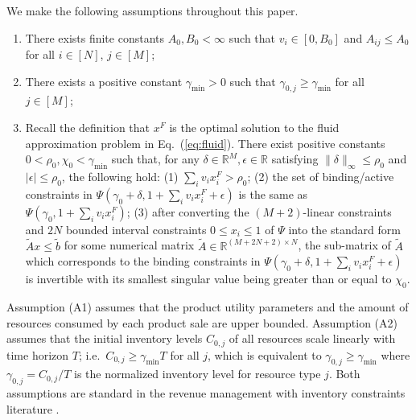 \documentclass[opre]{informs3aa}
\renewcommand{\tilde}{\widetilde}
\renewcommand{\tilde}{\widetilde}
\newcommand{\R}{ \mathbb{R} }
\begin{document}
We make the following assumptions throughout this paper.
\begin{enumerate}
\item[(A1)] There exists finite constants $A_0,B_0<\infty$ such that $v_i\in[0,B_0]$ and $A_{ij}\leq A_0$ for all $i\in[N]$, $j\in[M]$;
\item[(A2)] There exists a positive constant $\gamma_{\min}>0$ such that $\gamma_{0,j}\geq\gamma_{\min}$ for all $j\in[M]$;
\item[(A3)] {Recall the definition that $x^F$ is the optimal solution to the fluid approximation problem in Eq.~(\ref{eq:fluid}).}
There exist positive constants $0<\rho_0,\chi_0<\gamma_{\min}$ such that, for any $\delta\in\mathbb R^M,\epsilon\in\mathbb R$ satisfying $\|\delta\|_{\infty}\leq\rho_0$ and
$|\epsilon|\leq\rho_0$, the following hold:
(1) $\sum_i v_ix_i^F> \rho_0$; (2) the set of binding/active constraints in $\Psi(\gamma_0+\delta,1+\sum_iv_ix_i^F+\epsilon)$ is the same as $\Psi(\gamma_0,1+\sum_i v_ix_i^F)$;
(3) after converting the $(M+2)$-linear constraints and $2N$ bounded interval constraints $0 \le x_i\le 1$ of $\Psi$ into the standard form $\tilde Ax\leq \tilde b$ for some numerical matrix $\tilde A\in \R^{(M + 2N + 2)\times N}$, the sub-matrix of $\tilde A$ which corresponds to the binding constraints in $\Psi(\gamma_0+\delta,1+\sum_iv_ix_i^F+\epsilon)$ is invertible with its smallest singular value being greater than or equal to $\chi_0$.  %
\end{enumerate}

Assumption (A1) assumes that the product utility parameters and the amount of resources consumed by each product sale are upper bounded.
{Assumption (A2) assumes that the initial inventory levels $C_{0,j}$ of all resources scale linearly with time horizon $T$; i.e.~$C_{0,j}\geq \gamma_{\min}T$ for all $j$,
which is equivalent to $\gamma_{0,j}\geq\gamma_{\min}$ where $\gamma_{0,j}=C_{0,j}/T$ is the normalized inventory level for resource type $j$.}
Both assumptions are standard in the revenue management with inventory constraints literature \citep{WDY2014,ferreira2018online,besbes2012blind,jasin2014reoptimization}.
\end{document}

